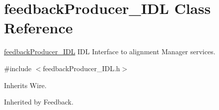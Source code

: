 \section{feedback\+Producer\+\_\+\+I\+DL Class Reference}
\label{classfeedbackProducer__IDL}


\hyperlink{classfeedbackProducer__IDL}{feedback\+Producer\+\_\+\+I\+DL} I\+DL Interface to alignment Manager services.  




{\ttfamily \#include $<$feedback\+Producer\+\_\+\+I\+D\+L.\+h$>$}



Inherits Wire.



Inherited by Feedback.

